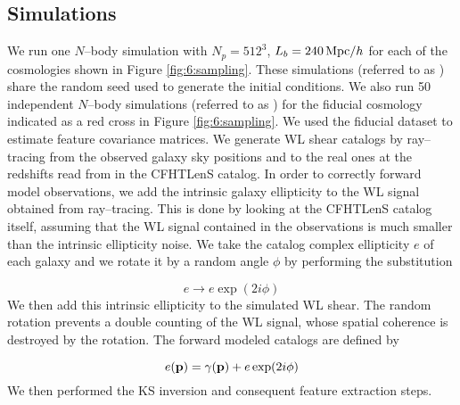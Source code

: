 \subsection{Simulations}
We run one $N$--body simulation with $N_p=512^3$, $L_b=240\,{\rm Mpc}/h$ for each of the cosmologies shown in Figure \ref{fig:6:sampling}. These simulations (referred to as ) share the random seed used to generate the initial conditions. We also run 50 independent $N$--body simulations (referred to as ) for the fiducial cosmology indicated as a red cross in Figure \ref{fig:6:sampling}. We used the fiducial dataset to estimate feature covariance matrices. We generate WL shear catalogs by ray--tracing from the observed galaxy sky positions and to the real ones at the redshifts read from in the CFHTLenS catalog. In order to correctly forward model observations, we add the intrinsic galaxy ellipticity to the WL signal obtained from ray--tracing. This is done by looking at the CFHTLenS catalog itself, assuming that the WL signal contained in the observations is much smaller than the intrinsic ellipticity noise. We take the catalog complex ellipticity $e$ of each galaxy and we rotate it by a random angle $\phi$ by performing the substitution

\begin{equation}
\label{eq:6:randrot}
e \rightarrow e\exp(2i\phi)
\end{equation} 
%
We then add this intrinsic ellipticity to the simulated WL shear. The random rotation prevents a double counting of the WL signal, whose spatial coherence is destroyed by the rotation. The forward modeled catalogs are defined by

\begin{equation}
\label{eq:6:forwardcatalog}
e(\mathbf{p}) = \gamma(\mathbf{p}) + e\exp(2i\phi)
\end{equation}
%
We then performed the KS inversion and consequent feature extraction steps.      


